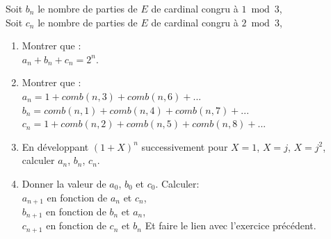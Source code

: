 \documentclass[a4paper,11pt]{book}
\begin{document}
Soit $b_n$ le nombre de parties de $E$ de cardinal congru \`a $1\bmod 3$,\\
Soit $c_n$ le nombre de parties de $E$ de cardinal congru \`a $2\bmod 3$,\\
\begin{enumerate}
\item Montrer que :\\
$a_n+b_n+c_n=2^n$.
\item Montrer que :\\
$a_n=1+comb(n,3)+comb(n,6)+...$
$b_n=comb(n,1)+comb(n,4)+comb(n,7)+...$
$c_n=1+comb(n,2)+comb(n,5)+comb(n,8)+...$
\item En d\'eveloppant $(1+X)^n$ successivement pour $X=1$, $X=j$, $X=j^2$, 
calculer $a_n$, $b_n$, $c_n$.
\item Donner la valeur de $a_0$, $b_0$ et $c_0$.
 Calculer:\\
$a_{n+1}$ en fonction de $a_n$ et $c_n$,\\
$b_{n+1}$ en fonction de $b_n$ et $a_n$,\\
$c_{n+1}$ en fonction de $c_n$ et $b_n$
Et faire le lien avec l'exercice pr\'ec\'edent.\\
\end{enumerate}
\end{document}
